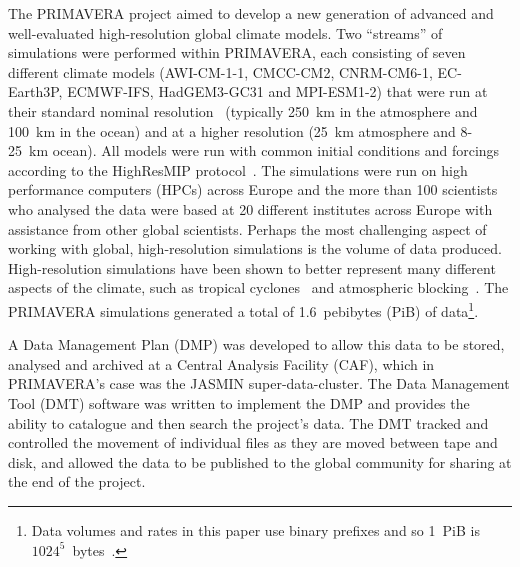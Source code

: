 \documentclass[gmd, manuscript]{copernicus}
\begin{document}


\introduction  %

The PRIMAVERA project aimed to develop a new generation of advanced and well-evaluated high-resolution global climate models. Two ``streams'' of simulations were performed within PRIMAVERA, each consisting of seven different climate models (AWI-CM-1-1, CMCC-CM2, CNRM-CM6-1, EC-Earth3P, ECMWF-IFS, HadGEM3-GC31 and MPI-ESM1-2) that were run at their standard nominal resolution~\citep{GloablAttr} (typically  250~km in the atmosphere and 100~km in the ocean) and at a higher resolution (25~km atmosphere and 8-25~km ocean). All models were run with common initial conditions and forcings according to the HighResMIP protocol~\citep{Haarsma2016}. The simulations were run on high performance computers (HPCs) across Europe and the more than 100 scientists who analysed the data were based at 20 different institutes across Europe with assistance from other global scientists. Perhaps the most challenging aspect of working with global, high-resolution simulations is the volume of data produced. High-resolution simulations have been shown to better represent many different aspects of the climate, such as tropical cyclones~\citep{Roberts2020} and atmospheric blocking~\citep{Schiemann2019}. The PRIMAVERA simulations generated a total of 1.6~pebibytes (PiB) of data\footnote{Data volumes and rates in this paper use binary prefixes and so 1~PiB is $1024^5$~bytes~\citep{IEEE1541}.}.

A Data Management Plan (DMP) was developed to allow this data to be stored, analysed and archived at a Central Analysis Facility (CAF), which in PRIMAVERA's case was the JASMIN super-data-cluster. The Data Management Tool (DMT) software was written to implement the DMP and provides the ability to catalogue and then search the project's data. The DMT tracked and controlled the movement of individual files as they are moved between tape and disk, and allowed the data to be published to the global community for sharing at the end of the project.
\end{document}
